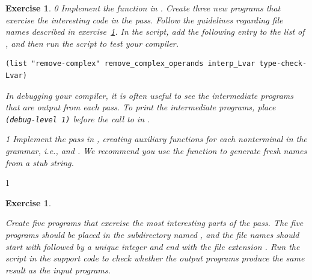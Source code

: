 \documentclass[7x10]{TimesAPriori_MIT}%
\def\racketEd{0}
\def\pythonEd{1}
\def\edition{1}
\newcommand{\pythonColor}[0]{}
\newtheorem{exercise}[theorem]{Exercise}
\numberwithin{theorem}{chapter}
\numberwithin{definition}{chapter}
\numberwithin{equation}{chapter}
\begin{document}
\begin{exercise}
  \normalfont\normalsize
{\if\edition\racketEd  
Implement the  function in
.
%
Create three new \LangVar{} programs that exercise the interesting
code in the  pass.  Follow the guidelines
regarding file names described in exercise~\ref{ex:Lvar}.
%
In the  script, add the following entry to the
list of , and then run the script to test your compiler.
\begin{lstlisting}
(list "remove-complex" remove_complex_operands interp_Lvar type-check-Lvar)
\end{lstlisting}
In debugging your compiler, it is often useful to see the intermediate
programs that are output from each pass. To print the intermediate
programs, place \lstinline{(debug-level 1)} before the call to
 in .  \fi}
%
{\if\edition\pythonEd\pythonColor
  Implement the  pass in
  , creating auxiliary functions for each
  nonterminal in the grammar, i.e., 
  and . We recommend you use the function
   to generate fresh names from a stub string.
\fi}  
\end{exercise}

{\if\edition\pythonEd\pythonColor
\begin{exercise}
\normalfont\normalsize
\label{ex:Lvar}

Create five \LangVar{} programs that exercise the most interesting
parts of the  pass.  The five programs
should be placed in the subdirectory named , and the file
names should start with  followed by a unique
integer and end with the file extension .
Run the  script in the support code to check
whether the output programs produce the same result as the input
programs.
\end{exercise}

\fi}
\end{document}
